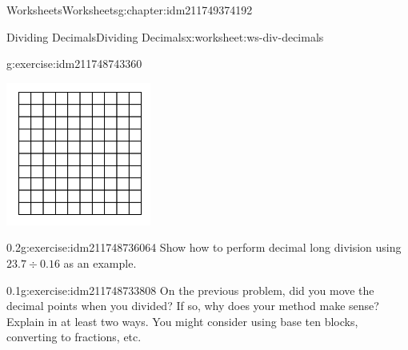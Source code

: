 \documentclass[twoside,11pt,]{book}
\begin{document}
\begin{chapterptx}{Worksheets}{}{Worksheets}{}{}{g:chapter:idm211749374192}
\begin{worksheet-section-numberless}{Dividing Decimals}{}{Dividing Decimals}{}{}{x:worksheet:ws-div-decimals}
\begin{divisionexercise}{2}{}{}{g:exercise:idm211748743360}
\begin{enumerate}[label=(\alph*)]
\begin{sidebyside}{1}{0.3}{0.3}{0}
\begin{sbspanel}{0.4}
\includegraphics[width=1\linewidth]{images/decimal-square.png}
\end{sbspanel}%
\end{sidebyside}%
%
\end{enumerate}
\end{divisionexercise}%
\begin{divisionexercise}{3}{}{0.2}{g:exercise:idm211748736064}%
Show how to perform decimal long division using \(23.7 \div 0.16 \) as an example.%
\end{divisionexercise}%
\clearpage
\begin{divisionexercise}{4}{}{0.1}{g:exercise:idm211748733808}%
On the previous problem, did you move the decimal points when you divided? If so, why does your method make sense?  Explain in at least two ways. You might consider using base ten blocks, converting to fractions, etc.%
\end{divisionexercise}%
\end{worksheet-section-numberless}
\restoregeometry
\end{chapterptx}
\end{document}
